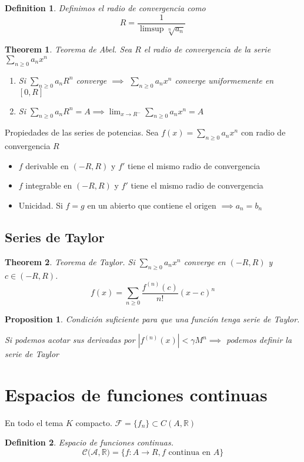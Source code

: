 \documentclass{myclass}
\newtheorem*{definition}{Definition}
\newtheorem*{theorem}{Theorem}
\newtheorem*{proposition}{Proposition}
\begin{document}
\begin{definition}
Definimos el radio de convergencia como
\[
R = \frac{1}{\limsup \sqrt[n]{a_n} }
\] 
\end{definition}

\begin{theorem}
Teorema de Abel. Sea $R$ el radio de convergencia de la serie  $\sum_{n\ge 0} a_nx^n$
\begin{enumerate}[topsep=0pt, itemsep=0pt]
  \item Si $\sum_{n\ge 0} a_nR^n$ converge $\implies$ $\sum_{n\ge 0} a_nx^n$ converge uniformemente en $[0, R]$
  \item Si  $\sum_{n\ge 0} a_nR^n=A \implies \lim_{x\to R^-} \sum_{n\ge 0} a_nx^n = A$  
\end{enumerate}
\end{theorem}

Propiedades de las series de potencias. Sea $f(x) = \sum_{n\ge 0} a_nx^n$ con radio de convergencia $R$
 \begin{itemize}[topsep=0pt, itemsep=0pt]
  \item $f$ derivable en  $(-R, R)$ y $f'$ tiene el mismo radio de convergencia
  \item $f$ integrable en  $(-R, R)$ y $f'$ tiene el mismo radio de convergencia
  \item Unicidad. Si $f=g$ en un abierto que contiene el origen $ \implies a_n = b_n$
\end{itemize}

\subsection{Series de Taylor}
\begin{theorem}
Teorema de Taylor. Si $\sum_{n\ge 0} a_nx^n$ converge en $(-R, R)$ y  $c\in (-R, R)$.
\[
f(x) = \sum_{n\ge 0} \frac{f^{(n)}(c)}{n!}(x-c)^n
\] 
\end{theorem}

\begin{proposition}
Condición suficiente para que una función tenga serie de Taylor.

Si podemos acotar sus derivadas por $|f^{(n)}(x)|<\gamma M^n \implies$ podemos definir la serie de Taylor 
\end{proposition}

\section{Espacios de funciones continuas}
En todo el tema $K$ compacto. $\mathcal{F} = \{f_n\}\subset C(A, \mathbb{R})$
\begin{definition}
Espacio de funciones continuas.
\[
\mathcal{C(A, \mathbb{R}} ) = \{f:A\to R, f \text{ continua en }A\}
\] 
\end{definition}
\end{document}
